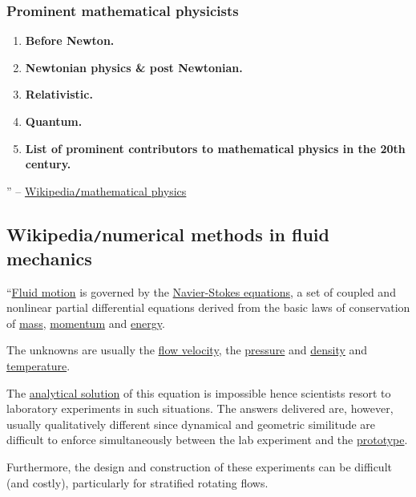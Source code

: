 \documentclass{article}
\begin{document}
\subsubsection{Prominent mathematical physicists}

\begin{enumerate}
	\item {\bf Before Newton.}
	\item {\bf Newtonian physics \& post Newtonian.}
	\item {\bf Relativistic.}
	\item {\bf Quantum.}
	\item {\bf List of prominent contributors to mathematical physics in the 20th century.}
\end{enumerate}
'' -- \href{https://en.wikipedia.org/wiki/Mathematical_physics}{Wikipedia{\tt/}mathematical physics}


\subsection{Wikipedia{\tt/}numerical methods in fluid mechanics}
``\href{https://en.wikipedia.org/wiki/Fluid_motion}{Fluid motion} is governed by the \href{https://en.wikipedia.org/wiki/Navier-Stokes_equations}{Navier-Stokes equations}, a set of coupled and nonlinear partial differential equations derived from the basic laws of conservation of \href{https://en.wikipedia.org/wiki/Mass}{mass}, \href{https://en.wikipedia.org/wiki/Momentum}{momentum} and \href{https://en.wikipedia.org/wiki/Energy}{energy}.

The unknowns are usually the \href{https://en.wikipedia.org/wiki/Flow_velocity}{flow velocity}, the \href{https://en.wikipedia.org/wiki/Pressure}{pressure} and \href{https://en.wikipedia.org/wiki/Density}{density} and \href{https://en.wikipedia.org/wiki/Temperature}{temperature}.

The \href{https://en.wikipedia.org/wiki/Analytical_solution}{analytical solution} of this equation is impossible hence scientists resort to laboratory experiments in such situations. The answers delivered are, however, usually qualitatively different since dynamical and geometric similitude are difficult to enforce simultaneously between the lab experiment and the \href{https://en.wikipedia.org/wiki/Prototype}{prototype}.

Furthermore, the design and construction of these experiments can be difficult (and costly), particularly for stratified rotating flows.
\end{document}
